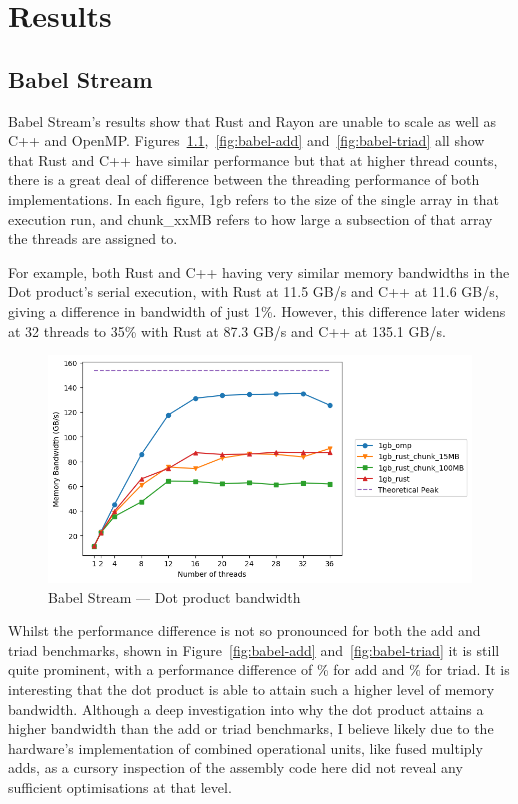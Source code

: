 \chapter{Results}
\section{Babel Stream}\label{sec:res-babel}
Babel Stream's results show that Rust and Rayon are unable to scale as well as C++ and OpenMP\@. Figures~\ref{fig:babel-dot},~\ref{fig:babel-add} and~\ref{fig:babel-triad} all show that Rust and C++ have similar performance but that at higher thread counts, there is a great deal of difference between the threading performance of both implementations. In each figure, 1gb refers to the size of the single array in that execution run, and chunk\_xxMB refers to how large a subsection of that array the threads are assigned to.

For example, both Rust and C++ having very similar memory bandwidths in the Dot product's serial execution, with Rust at 11.5 GB/s and C++ at 11.6 GB/s, giving a difference in bandwidth of just 1\%.
However, this difference later widens at 32 threads to 35\% with Rust at 87.3 GB/s and C++ at 135.1 GB/s.

\begin{figure}[h]
\centering
\includegraphics[width=.9\linewidth]{figs/babel/Dot.png}
\caption{Babel Stream --- Dot product bandwidth}\label{fig:babel-dot}
\end{figure}

Whilst the performance difference is not so pronounced for both the add and triad benchmarks, shown in Figure~\ref{fig:babel-add} and~\ref{fig:babel-triad} it is still quite prominent, with a performance difference of \% for add and \% for triad. It is interesting that the dot product is able to attain such a higher level of memory bandwidth. Although a deep investigation into why the dot product attains a higher bandwidth than the add or triad benchmarks, I believe likely due to the hardware's implementation of combined operational units, like fused multiply adds, as a cursory inspection of the assembly code here did not reveal any sufficient optimisations at that level.

